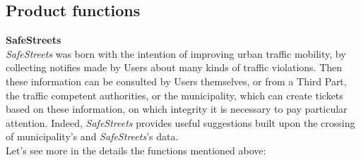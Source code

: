       


\subsection{Product
functions}

\textbf{SafeStreets}\\

\textit{SafeStreets} was born with the intention of improving urban traffic mobility, by collecting notifies made by Users about many kinds of traffic violations. Then these information can be consulted by Users themselves, or from a Third Part, the traffic competent authorities, or the municipality, which can create tickets based on these information, on which integrity it is necessary to pay particular attention. Indeed, \textit{SafeStreets} provides useful suggestions built upon the crossing of municipality's and \textit{SafeStreets}'s data. \\
Let's see more in the details the functions mentioned above:\\\\

